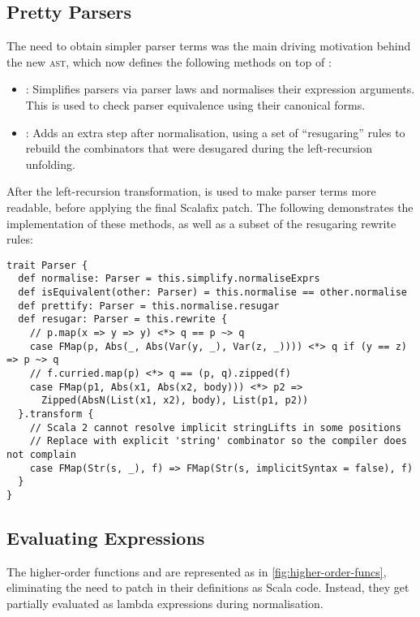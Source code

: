 \documentclass[../../main.tex]{subfiles}
\begin{document}
\subsection{Pretty Parsers}
The need to obtain simpler parser terms was the main driving motivation behind the new  \textsc{ast}, which now defines the following methods on top of :
\begin{itemize}
  \item {}: Simplifies parsers via parser laws and normalises their expression arguments. This is used to check parser equivalence using their canonical forms.
  \item {}: Adds an extra step after normalisation, using a set of ``resugaring'' rules to rebuild the combinators that were desugared during the left-recursion unfolding.
\end{itemize}
%
After the left-recursion transformation,  is used to make parser terms more readable, before applying the final Scalafix patch.
The following demonstrates the implementation of these methods, as well as a subset of the resugaring rewrite rules:
\begin{verbatim}
trait Parser {
  def normalise: Parser = this.simplify.normaliseExprs
  def isEquivalent(other: Parser) = this.normalise == other.normalise
  def prettify: Parser = this.normalise.resugar
  def resugar: Parser = this.rewrite {
    // p.map(x => y => y) <*> q == p ~> q
    case FMap(p, Abs(_, Abs(Var(y, _), Var(z, _)))) <*> q if (y == z) => p ~> q
    // f.curried.map(p) <*> q == (p, q).zipped(f)
    case FMap(p1, Abs(x1, Abs(x2, body))) <*> p2 =>
      Zipped(AbsN(List(x1, x2), body), List(p1, p2))
  }.transform {
    // Scala 2 cannot resolve implicit stringLifts in some positions
    // Replace with explicit 'string' combinator so the compiler does not complain
    case FMap(Str(s, _), f) => FMap(Str(s, implicitSyntax = false), f)
  }
}
\end{verbatim}

\subsection{Evaluating Expressions}
The higher-order functions  and  are represented as in \cref{fig:higher-order-funcs}, eliminating the need to patch in their definitions as Scala code.
Instead, they get partially evaluated as lambda expressions during normalisation.
\end{document}
